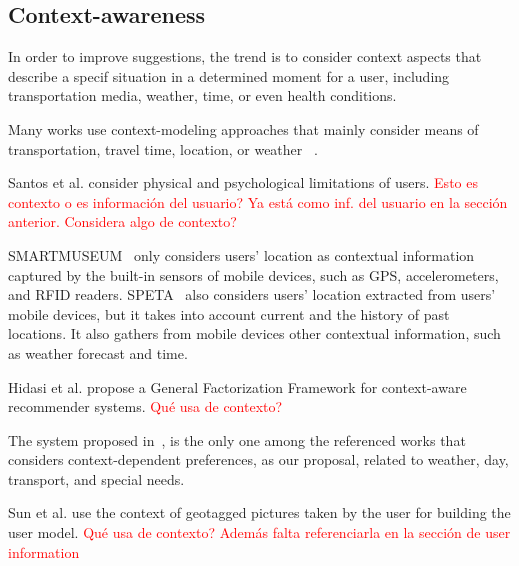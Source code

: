 \subsection{Context-awareness}
In order to improve suggestions, the trend is to consider context aspects that describe a specif situation in a determined moment for a user, including transportation media, weather, time, or even health conditions. 

Many works use context-modeling approaches that mainly consider means of transportation, travel time,  location, or weather~\cite{rajaonarivo2019rec}\cite{bahramian_abbaspour_claramunt_2017}\cite{arigi2018context}\cite{kesorn2017personalized}\cite{logesh2019exploring} \cite{logesh2018personalised}.

Santos et al. \cite{santos2019using} consider physical and psychological limitations of users. \textcolor{red}{Esto es contexto o es información del usuario? Ya está como inf. del usuario en la sección anterior. Considera algo de contexto?}


SMARTMUSEUM~\cite{ruotsalo2013smartmuseum} only considers users' location as contextual information captured by the built-in sensors of mobile devices, such as GPS, accelerometers, and RFID readers. SPETA~\cite{garcia2009speta} also considers users' location extracted from users' mobile devices, but it takes into account current and the history of past locations. It also gathers from  mobile devices other contextual information, such as weather forecast and time.




Hidasi et al. \cite{hidasi2016general} propose a General Factorization Framework for context-aware recommender systems. \textcolor{red}{Qué usa de contexto?}





The system proposed in~\cite{alonso2012ontology}, is the only one among the referenced works that considers context-dependent   preferences, as our proposal,  related to weather, day, transport, and special needs.


Sun et al. \cite{sun2019building} use the context of geotagged pictures taken by the user for building the user model. \textcolor{red}{Qué usa de contexto? Además falta referenciarla en la sección de user information}

